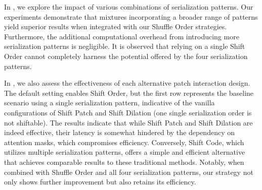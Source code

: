 In , we explore the impact of various combinations of serialization patterns. Our experiments demonstrate that mixtures incorporating a broader range of patterns yield superior results when integrated with our Shuffle Order strategies. Furthermore, the additional computational overhead from introducing more serialization patterns is negligible. 
It is observed that relying on a single Shift Order cannot completely harness the potential offered by the four serialization patterns.


In , we also assess the effectiveness of each alternative patch interaction design. The default setting enables Shift Order, but the first row represents the baseline scenario using a single serialization pattern, indicative of the vanilla configurations of Shift Patch and Shift Dilation (one single serialization order is not shiftable). The results indicate that while Shift Patch and Shift Dilation are indeed effective, their latency is somewhat hindered by the dependency on attention masks, which compromises efficiency. Conversely, Shift Code, which utilizes multiple serialization patterns, offers a simple and efficient alternative that achieves comparable results to these traditional methods. Notably, when combined with Shuffle Order and all four serialization patterns, our strategy not only shows further improvement but also retains its efficiency.

\begin{table}[t]
    \begin{minipage}{0.48\textwidth}
    \centering
        
        \vspace{-3mm}
        \caption{\textbf{Indoor semantic segmentation.}}\label{tab:indoor_sem_seg}
        \vspace{2mm}
    \end{minipage} \\
    \begin{minipage}{0.48\textwidth}
    \centering
        
        \vspace{-3mm}
        \caption{\textbf{S3DIS 6-fold cross-validation.}}\label{tab:s3dis_6fold}
        \vspace{-4mm}
    \end{minipage}
\end{table}

